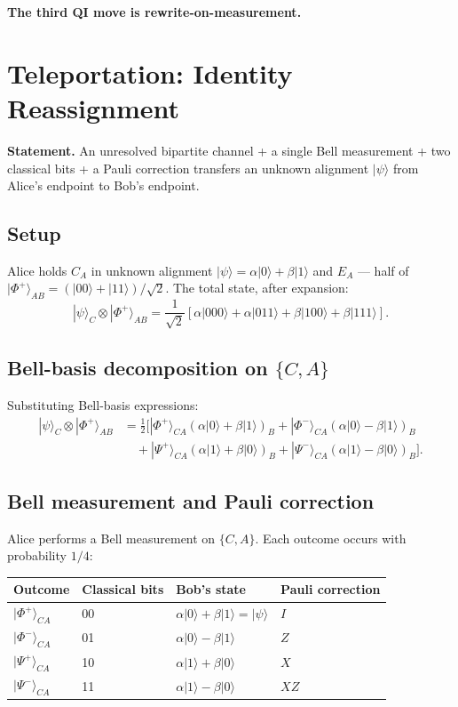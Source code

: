 \documentclass[11pt,a4paper]{article}
\begin{document}
\textbf{The third QI move is rewrite-on-measurement.}

\section{Teleportation: Identity Reassignment}

\textbf{Statement.} An unresolved bipartite channel + a single Bell measurement + two classical bits + a Pauli correction transfers an unknown alignment $|\psi\rangle$ from Alice's endpoint to Bob's endpoint.

\subsection{Setup}

Alice holds $C_A$ in unknown alignment $|\psi\rangle = \alpha|0\rangle + \beta|1\rangle$ and $E_A$ --- half of $|\Phi^+\rangle_{AB} = (|00\rangle + |11\rangle)/\sqrt{2}$. The total state, after expansion:
\[
|\psi\rangle_C \otimes |\Phi^+\rangle_{AB} = \frac{1}{\sqrt{2}}\left[\alpha|000\rangle + \alpha|011\rangle + \beta|100\rangle + \beta|111\rangle\right].
\]

\subsection{Bell-basis decomposition on $\{C, A\}$}

Substituting Bell-basis expressions:
\begin{align*}
|\psi\rangle_C \otimes |\Phi^+\rangle_{AB} &= \tfrac{1}{2}\Big[|\Phi^+\rangle_{CA}(\alpha|0\rangle + \beta|1\rangle)_B + |\Phi^-\rangle_{CA}(\alpha|0\rangle - \beta|1\rangle)_B \\
&\quad + |\Psi^+\rangle_{CA}(\alpha|1\rangle + \beta|0\rangle)_B + |\Psi^-\rangle_{CA}(\alpha|1\rangle - \beta|0\rangle)_B\Big].
\end{align*}

\subsection{Bell measurement and Pauli correction}

Alice performs a Bell measurement on $\{C, A\}$. Each outcome occurs with probability $1/4$:

\begin{center}
\small
\begin{tabular}{@{}llll@{}}
\toprule
Outcome & Classical bits & Bob's state & Pauli correction \\
\midrule
$|\Phi^+\rangle_{CA}$ & 00 & $\alpha|0\rangle + \beta|1\rangle = |\psi\rangle$ & $I$ \\
$|\Phi^-\rangle_{CA}$ & 01 & $\alpha|0\rangle - \beta|1\rangle$ & $Z$ \\
$|\Psi^+\rangle_{CA}$ & 10 & $\alpha|1\rangle + \beta|0\rangle$ & $X$ \\
$|\Psi^-\rangle_{CA}$ & 11 & $\alpha|1\rangle - \beta|0\rangle$ & $XZ$ \\
\bottomrule
\end{tabular}
\end{center}
\end{document}
